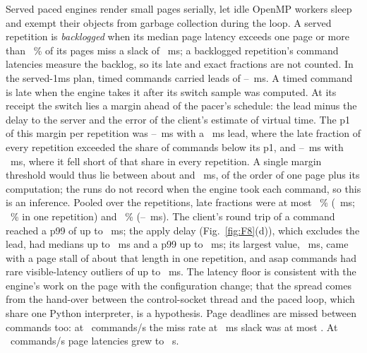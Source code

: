 Served paced engines render small pages serially, let idle OpenMP workers
sleep and exempt their objects from garbage collection during the loop. A served repetition is
\emph{backlogged} when its median page latency exceeds one page or more than
\numBacklogMissPct~\% of its pages miss a slack of \numBacklogSlackMs~ms; a backlogged
repetition's command latencies measure the backlog, so its late and exact fractions are not
counted. In the served-1ms plan, timed commands carried leads of
\numBfourLeadMinMs--\numBfourLeadMaxMs~ms. A timed command is late when the engine takes it
after its switch sample was computed. At its receipt the switch lies a margin ahead of the
pacer's schedule: the lead minus the delay to the server and the error of the client's
estimate of virtual time. The p1 of this margin per repetition was
\numBfourMarginTwoPoneMs--\numBfourMarginTwoPoneMaxMs~ms with a \numBfourLeadMinMs~ms lead,
where the late fraction of every repetition exceeded the share of commands below its p1, and
\numBfourMarginFourPoneMs--\numBfourMarginFourPoneMaxMs~ms with \numBfourLeadOkMs~ms, where it
fell short of that share in every repetition. A single margin threshold would thus lie between
about
\numBfourMarginTwoPoneMaxMs{} and \numBfourMarginFourPoneMs~ms, of the order of one page plus its
computation; the runs do not record when the engine took each command, so this is an
inference. Pooled over the repetitions, late fractions were at most
\numBfourLateFourMaxPct~\% (\numBfourLeadOkMs~ms; \numBfourLateFourRepMaxPct~\% in one
repetition) and \numBfourLateSixMaxPct~\% (\numBfourLeadSixMs--\numBfourLeadMaxMs~ms).
The client's round trip of a command reached a p99 of up to \numBfourRttPninetynineMaxMs~ms;
the apply delay (Fig.~\ref{fig:F8}(d)), which excludes the lead, had medians up to
\numBfourApplyPfiftyMaxMs~ms and a p99 up to \numBfourApplyPninetynineMaxMs~ms; its largest
value, \numBfourApplyMaxMs~ms, came with a page stall of about that length in one repetition,
and asap commands had rare visible-latency outliers of up to \numBfourVisMaxMs~ms. The latency floor
is consistent with the engine's work on the page with the configuration change; that the spread comes
from the hand-over between the control-socket thread and the paced loop, which share one
Python interpreter, is a hypothesis. Page deadlines are missed between commands too: at
\numBfourRateLowHz~commands/s the miss rate at \numBacklogSlackMs~ms slack was at most
\numBfourMissFiveLowMax. At \numBfourRateHighHz~commands/s page latencies grew to
\numBfourPageLatMaxS~s.

